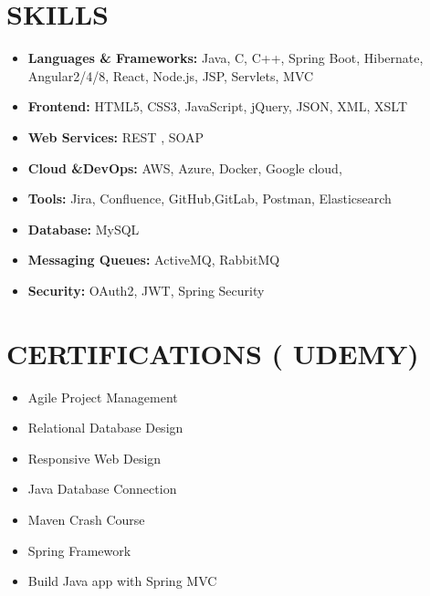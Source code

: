 \documentclass[letterpaper,11pt]{article}
\newcommand{\resumeItem}[1]{\item\small{{#1 \vspace{-3pt}}}}
\newcommand{\resumeSubHeadingListStart}{\begin{itemize}[leftmargin=0.15in, label={}]}
\newcommand{\resumeSubHeadingListEnd}{\end{itemize}}
\newcommand{\resumeItemListStart}{\begin{itemize}}
\newcommand{\resumeItemListEnd}{\end{itemize}\vspace{-5pt}}
\begin{document}
\section{{\fontsize{9pt}{20pt}\selectfont \textbf{SKILLS}}}\resumeSubHeadingListStart
\resumeItem{\textbf{Languages \& Frameworks:} Java, C, C++, Spring Boot, Hibernate, Angular2/4/8, React, Node.js, JSP, Servlets, MVC}\vspace{-7pt}
\resumeItem{\textbf{Frontend:} HTML5, CSS3, JavaScript, jQuery, JSON, XML, XSLT}\vspace{-7pt}
\resumeItem{\textbf{Web Services:} REST , SOAP}\vspace{-7pt}
\resumeItem{\textbf{Cloud \&DevOps:} AWS, Azure, Docker, Google cloud,}\vspace{-7pt}
\resumeItem{\textbf{Tools:} Jira, Confluence, GitHub,GitLab, Postman, Elasticsearch}\vspace{-7pt}
\resumeItem{\textbf{Database:} MySQL}\vspace{-7pt}
\resumeItem{\textbf{Messaging Queues:} ActiveMQ, RabbitMQ}\vspace{-7pt}
\resumeItem{\textbf{Security:} OAuth2, JWT, Spring Security}
\resumeSubHeadingListEnd\vspace{-10pt}
\section{{\fontsize{9pt}{20pt}\selectfont \textbf{CERTIFICATIONS ( UDEMY)}}}
\resumeItemListStart
\resumeItem{Agile Project Management}
\resumeItem{Relational Database Design}
\resumeItem{Responsive Web Design}
\resumeItem{Java Database Connection}
\resumeItem{Maven Crash Course}
\resumeItem{Spring Framework}
\resumeItem{Build Java app with Spring MVC}
\resumeItemListEnd
\vspace{-10pt}
\end{document}
